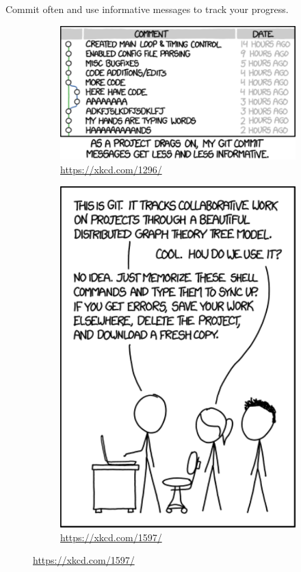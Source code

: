 Commit often and use informative messages to track your progress.

\begin{figure}[H]
\captionsetup[subfigure]{justification=centering}
\centering
\begin{subfigure}{.6\textwidth}
    \centering
    \includegraphics[width=\linewidth]{xkcd2.pdf}
    \caption{\url{https://xkcd.com/1296/}}
\end{subfigure}
\quad
\begin{subfigure}{.35\textwidth}
    \centering
    \includegraphics[width=\linewidth]{xkcd1.pdf}
    \caption{\url{https://xkcd.com/1597/}}
\end{subfigure}
\end{figure}

